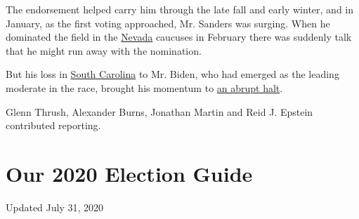 The endorsement helped carry him through the late fall and early winter,
and in January, as the first voting approached, Mr. Sanders was surging.
When he dominated the field in the
\href{https://www.nytimes.com/interactive/2020/02/22/us/elections/results-nevada-caucus.html}{Nevada}
caucuses in February there was suddenly talk that he might run away with
the nomination.

But his loss in
\href{https://www.nytimes.com/interactive/2020/02/29/us/elections/results-south-carolina-primary-election.html}{South
Carolina} to Mr. Biden, who had emerged as the leading moderate in the
race, brought his momentum to
\href{https://www.nytimes.com/2020/02/29/us/politics/joe-biden-south-carolina-primary.html}{an
abrupt halt}.

Glenn Thrush, Alexander Burns, Jonathan Martin and Reid J. Epstein
contributed reporting.

\hypertarget{our-2020-election-guide}{%
\section{Our 2020 Election Guide}\label{our-2020-election-guide}}

Updated July 31, 2020


